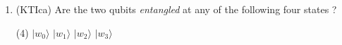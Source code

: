 \documentclass{article}
\begin{document}
\begin{enumerate}
\item (KTIca) Are the two qubits \textit{entangled} at any of the following four states ?
	\begin{tasks}(4) \task $|w_0\rangle$ \task $|w_1\rangle$ \task $|w_2\rangle$ \task $|w_3\rangle$  \end{tasks}
\end{enumerate}
\end{document}
